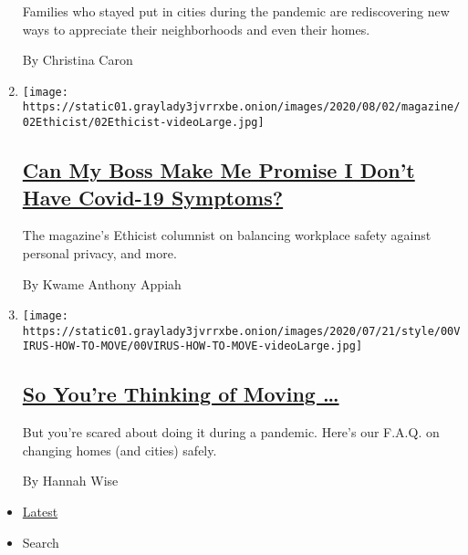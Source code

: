 \begin{enumerate}
  Families who stayed put in cities during the pandemic are
  rediscovering new ways to appreciate their neighborhoods and even
  their homes.

  By Christina Caron
\item
  \texttt{[image: https://static01.graylady3jvrrxbe.onion/images/2020/08/02/magazine/02Ethicist/02Ethicist-videoLarge.jpg]}

  \hypertarget{can-my-boss-make-me-promise-i-dont-have-covid-19-symptoms}{%
  \subsection{\texorpdfstring{\href{/2020/07/28/magazine/can-my-boss-make-me-promise-i-dont-have-covid-19-symptoms.html}{Can
  My Boss Make Me Promise I Don't Have Covid-19
  Symptoms?}}{Can My Boss Make Me Promise I Don't Have Covid-19 Symptoms?}}\label{can-my-boss-make-me-promise-i-dont-have-covid-19-symptoms}}

  The magazine's Ethicist columnist on balancing workplace safety
  against personal privacy, and more.

  By Kwame Anthony Appiah
\item
  \texttt{[image: https://static01.graylady3jvrrxbe.onion/images/2020/07/21/style/00VIRUS-HOW-TO-MOVE/00VIRUS-HOW-TO-MOVE-videoLarge.jpg]}

  \hypertarget{so-youre-thinking-of-moving-}{%
  \subsection{\texorpdfstring{\href{/2020/07/24/style/moving-during-covid-coronavirus.html}{So
  You're Thinking of Moving
  \ldots{}}}{So You're Thinking of Moving \ldots{}}}\label{so-youre-thinking-of-moving-}}

  But you're scared about doing it during a pandemic. Here's our F.A.Q.
  on changing homes (and cities) safely.

  By Hannah Wise
\end{enumerate}

\begin{itemize}
\tightlist
\item
  \protect\hyperlink{stream-panel}{Latest}
\item
  Search
\end{itemize}

